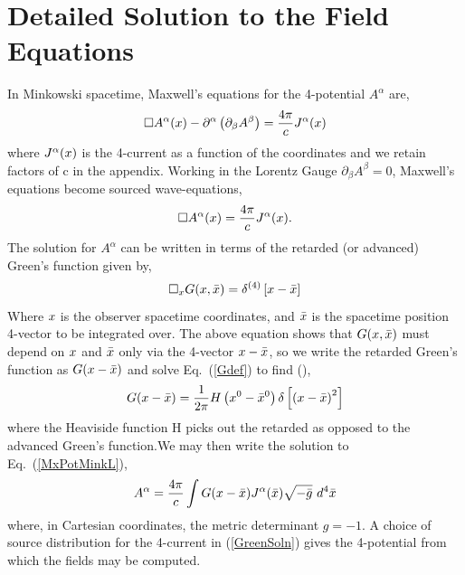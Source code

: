 \section{Detailed Solution to the Field Equations}
\label{AppendixA}
In Minkowski spacetime, Maxwell's equations for the 4-potential $A^{\alpha}$ are,
\begin{equation}
\Box A^{\alpha}({x}) - \partial^{\alpha} \left( \partial_{\beta} A^{\beta} \right)= \frac{4 \pi}{c}  J^{\alpha}({x})
\label{MxPotMink1}
\end{equation}
where $J^{\alpha}({x})$ is the 4-current as a function of the coordinates and we retain factors of c in the appendix. Working in the Lorentz  Gauge $  \partial_{\beta} A^{\beta}  = 0$,  Maxwell's equations become sourced wave-equations,
\begin{equation}
\Box A^{\alpha}({x}) = \frac{4 \pi}{c} J^{\alpha}({x}).
\label{MxPotMinkL}
\end{equation}
The solution for $A^{\alpha}$ 
can be written in terms of the retarded (or advanced) Green's function given by,
\begin{equation}
\Box_{{x}} G({x}, {\bar{x}}) = \delta^{(4)}\left[ {x} -{\bar{x}} \right]
\label{Gdef}
\end{equation}
Where ${x}$ is the observer spacetime coordinates, and ${\bar{x}}$ is the spacetime position 4-vector to be integrated over. The above equation shows that $G({x}, { \bar{x}})$ must depend on ${x}$ and ${\bar{x}}$ only via the 4-vector ${x} - {\bar{x}}$, so we write the retarded Green's function as $G({x} - {\bar{x}})$ and solve Eq.\ (\ref{Gdef}) to find (\cite{Jackson}), 
\begin{equation}
G({x} - {\bar{x}}) = \frac{1}{2 \pi} H \left( x^0  -  \bar{x}^0 \right)  \delta \left[ \left({x} -{\bar{x}}\right)^2 \right]
\label{Gr}
\end{equation}
where the Heaviside function H picks out the retarded as opposed to the advanced Green's function.We may then write the solution to Eq.\ (\ref{MxPotMinkL}),
\begin{equation}
A^{\alpha} = \frac{4 \pi}{c} \int{ G({x}-{\bar{x}}) J^{\alpha}({\bar{x}}) \sqrt{-\bar{g}}  \hbox{  } d^4\bar{{x}}}
\label{GreenSoln}
\end{equation}
where, in Cartesian coordinates, the metric determinant $g=-1$. A
choice of source distribution for the 4-current in (\ref{GreenSoln})
gives the 4-potential from which the fields may be computed. 


